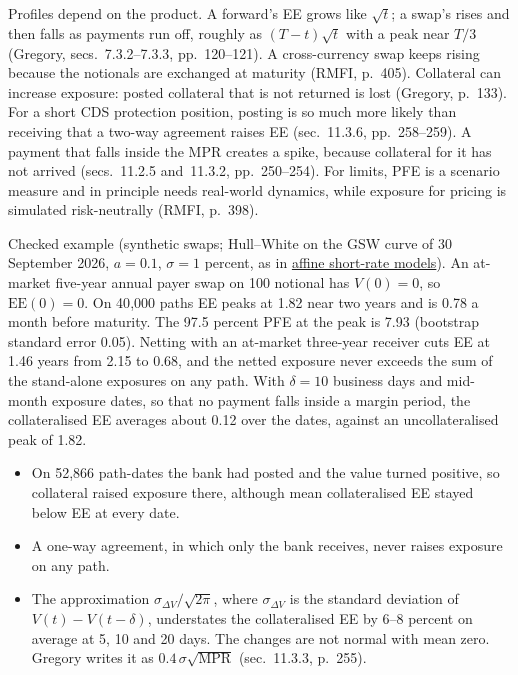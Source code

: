 \begin{qfdefinition}
 Profiles depend on the product. A forward's EE grows like $\sqrt t$; a swap's rises and then falls as payments run off, roughly as $(T-t)\sqrt t$ with a peak near $T/3$ (Gregory, secs.~7.3.2--7.3.3, pp.~120--121). A cross-currency swap keeps rising because the notionals are exchanged at maturity (RMFI, p.~405). Collateral can increase exposure: posted collateral that is not returned is lost (Gregory, p.~133). For a short CDS protection position, posting is so much more likely than receiving that a two-way agreement raises EE (sec.~11.3.6, pp.~258--259). A payment that falls inside the MPR creates a spike, because collateral for it has not arrived (secs.~11.2.5 and~11.3.2, pp.~250--254). For limits, PFE is a scenario measure and in principle needs real-world dynamics, while exposure for pricing is simulated risk-neutrally (RMFI, p.~398).

 Checked example (synthetic swaps; Hull--White on the GSW curve of 30 September 2026, $a=0.1$, $\sigma=1$ percent, as in \hyperref[mod:affine-short-rate-models]{affine short-rate models}). An at-market five-year annual payer swap on 100 notional has $V(0)=0$, so $\mathrm{EE}(0)=0$. On 40{,}000 paths EE peaks at 1.82 near two years and is 0.78 a month before maturity. The 97.5 percent PFE at the peak is 7.93 (bootstrap standard error 0.05). Netting with an at-market three-year receiver cuts EE at 1.46 years from 2.15 to 0.68, and the netted exposure never exceeds the sum of the stand-alone exposures on any path. With $\delta=10$ business days and mid-month exposure dates, so that no payment falls inside a margin period, the collateralised EE averages about 0.12 over the dates, against an uncollateralised peak of 1.82.
\begin{itemize}
\item On 52{,}866 path-dates the bank had posted and the value turned positive, so collateral raised exposure there, although mean collateralised EE stayed below EE at every date.
\item A one-way agreement, in which only the bank receives, never raises exposure on any path.
\item The approximation $\sigma_{\Delta V}/\sqrt{2\pi}$, where $\sigma_{\Delta V}$ is the standard deviation of $V(t)-V(t-\delta)$, understates the collateralised EE by 6--8 percent on average at 5, 10 and 20 days. The changes are not normal with mean zero. Gregory writes it as $0.4\,\sigma\sqrt{\text{MPR}}$ (sec.~11.3.3, p.~255).
\end{itemize}


\end{qfdefinition}
